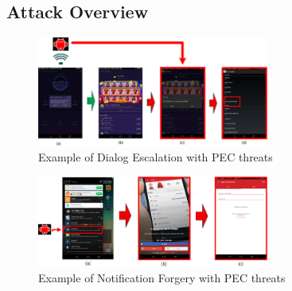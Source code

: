\documentclass{sig-alternate-05-2015}
\begin{document}
%


\subsection{Attack Overview}

\begin{figure}
\centering
\includegraphics[width = 3.0in]{pic2.png}
\caption{\label{}Example of Dialog Escalation with PEC threats}
\end{figure}

\begin{figure}
\centering
\includegraphics[width = 3.0in]{pic3.png}
\caption{\label{}Example of Notification Forgery with PEC threats}
\end{figure}
\end{document}
